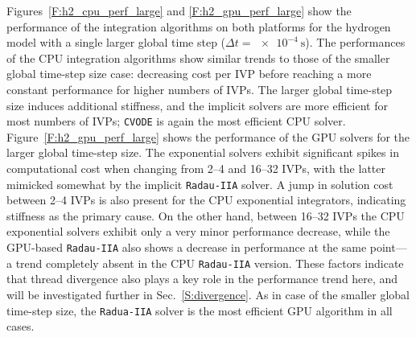 \documentclass[preprint,review,11pt]{elsarticle}
\begin{document}
Figures~\ref{F:h2_cpu_perf_large} and \ref{F:h2_gpu_perf_large} show the performance of the integration algorithms on both platforms for the hydrogen model with a single larger global time step ($\Delta t=\SI{e-4}{\second}$).
The performances of the CPU integration algorithms show similar trends to those of the smaller global time-step size case: decreasing cost per IVP before reaching a more constant performance for higher numbers of IVPs.
The larger global time-step size induces additional stiffness, and the implicit solvers are more efficient for most numbers of IVPs; \texttt{CVODE} is again the most efficient CPU solver.
Figure~\ref{F:h2_gpu_perf_large} shows the performance of the GPU solvers for the larger global time-step size.
The exponential solvers exhibit significant spikes in computational cost when changing from 2--4 and 16--32 IVPs, with the latter mimicked somewhat by the implicit \texttt{Radau-IIA} solver.
A jump in solution cost between 2--4 IVPs is also present for the CPU exponential integrators, indicating stiffness as the primary cause.
On the other hand, between 16--32 IVPs the CPU exponential solvers exhibit only a very minor performance decrease, while the GPU-based \texttt{Radau-IIA} also shows a decrease in performance at the same point---a trend completely absent in the CPU \texttt{Radau-IIA} version.
These factors indicate that thread divergence also plays a key role in the performance trend here, and will be investigated further in Sec.~\ref{S:divergence}.
As in case of the smaller global time-step size, the \texttt{Radua-IIA} solver is the most efficient GPU algorithm in all cases.
\end{document}
